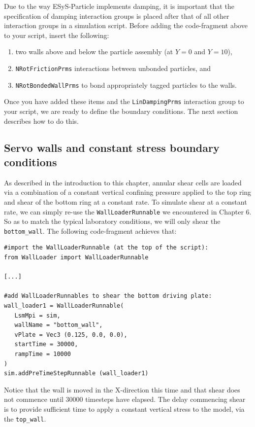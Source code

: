 Due to the way ESyS-Particle implements damping, it is important that the specification of damping interaction groups is placed after that of all other interaction groups in a simulation script. Before adding the code-fragment above to your script, insert the following:

\begin{enumerate}
   \item two walls above and below the particle assembly (at $Y=0$ and $Y=10$),
   \item \texttt{NRotFrictionPrms} interactions between unbonded particles, and
   \item \texttt{NRotBondedWallPrms} to bond appropriately tagged particles to the walls.
\end{enumerate}

\noindent
Once you have added these items and the \texttt{LinDampingPrms} interaction group to your script, we are ready to define the boundary conditions. The next section describes how to do this.

\subsection{Servo walls and constant stress boundary conditions}

As described in the introduction to this chapter, annular shear cells are loaded via a combination of a constant vertical confining pressure applied to the top ring and shear of the bottom ring at a constant rate. To simulate shear at a constant rate, we can simply re-use the \texttt{WallLoaderRunnable} we encountered in Chapter 6. So as to match the typical laboratory conditions, we will only shear the \texttt{bottom\_wall}. The following code-fragment achieves that:

\begin{verbatim}
#import the WallLoaderRunnable (at the top of the script):
from WallLoader import WallLoaderRunnable

[...]

#add WallLoaderRunnables to shear the bottom driving plate:
wall_loader1 = WallLoaderRunnable(
   LsmMpi = sim,
   wallName = "bottom_wall",
   vPlate = Vec3 (0.125, 0.0, 0.0),
   startTime = 30000,
   rampTime = 10000
)
sim.addPreTimeStepRunnable (wall_loader1)
\end{verbatim}

\noindent
Notice that the wall is moved in the X-direction this time and that shear does not commence until $30000$ timesteps have elapsed. The delay commencing shear is to provide sufficient time to apply a constant vertical stress to the model, via the \texttt{top\_wall}. 

